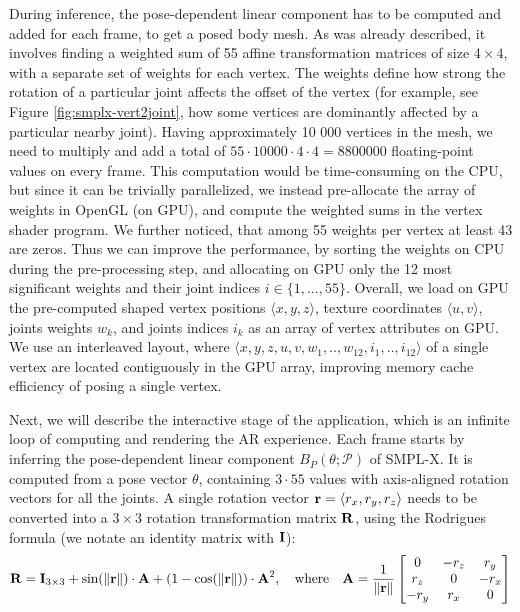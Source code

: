 During inference, the pose-dependent linear component has to be computed and added for each frame, to get a posed body mesh. As was already described, it involves finding a weighted sum of 55 affine transformation matrices of size $4 \times 4$, with a separate set of weights for each vertex. The weights define how strong the rotation of a particular joint affects the offset of the vertex (for example, see Figure \ref{fig:smplx-vert2joint}, how some vertices are dominantly affected by a particular nearby joint). Having approximately 10 000 vertices in the mesh, we need to multiply and add a total of $55 \cdot 10 000 \cdot 4 \cdot 4 = 8 800 000$ floating-point values on every frame. This computation would be time-consuming on the CPU, but since it can be trivially parallelized, we instead pre-allocate the array of weights in OpenGL (on GPU), and compute the weighted sums in the vertex shader program. We further noticed, that among 55 weights per vertex at least 43 are zeros. Thus we can improve the performance, by sorting the weights on CPU during the pre-processing step, and allocating on GPU only the 12 most significant weights  and their joint indices $i \in \{1,...,55\}$. Overall, we load on GPU the pre-computed shaped vertex positions $\langle x, y, z \rangle$, texture coordinates $\langle u, v \rangle$, joints weights $w_k$, and joints indices $i_k$ as an array of vertex attributes on GPU. We use an interleaved layout, where $\langle x, y, z, u, v, w_1, .., w_{12}, i_1, .., i_{12}\rangle$ of a single vertex are located contiguously in the GPU array, improving memory cache efficiency of posing a single vertex. 

Next, we will describe the interactive stage of the application, which is an infinite loop of computing and rendering the AR experience. Each frame starts by inferring the pose-dependent linear component $B_P(\theta; \mathcal{P})$ of SMPL-X. It is computed from a pose vector $\theta$, containing $3 \cdot 55$ values with axis-aligned rotation vectors for all the joints. A single rotation vector $\bm{\mathrm{r}} = \langle r_x, r_y, r_z \rangle$ needs to be converted into a $3\times3$ rotation transformation matrix $\bm{\mathrm{R}}$, using the Rodrigues \cite{aux:rodrigues11} formula (we notate an identity matrix with $\bm{\mathrm{I}}$):
\begin{equation}
	\bm{\mathrm{R}} = \bm{\mathrm{I}}_{3\times3} + \text{sin}(\|\bm{\mathrm{r}}\|)\cdot \bm{\mathrm{A}} + (1-\text{cos}(\|\bm{\mathrm{r}}\|))\cdot \bm{\mathrm{A}}^2,
	\quad \text{where} \quad
	\bm{\mathrm{A}} = \dfrac{1}{\|\bm{\mathrm{r}}\|}
	\begin{bmatrix} 
		0 & -r_z & r_y \\
		r_z & 0 & -r_x \\
		-r_y & r_x & 0
	\end{bmatrix}
	\label{methods:eq:rodrigues}
\end{equation}

